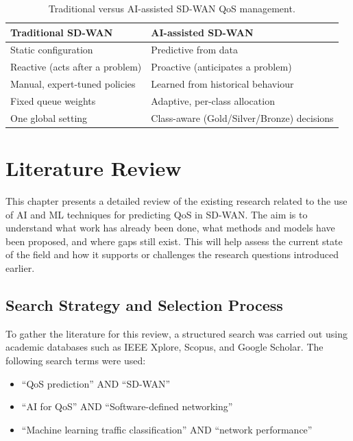 \documentclass[a4paper,12pt]{Classes/RoboticsLaTeX}
\begin{document}
    \begin{table}[H]
    \centering
    \caption{Traditional versus AI-assisted SD-WAN QoS management.}
    \label{tab:trad_vs_ai}
    \begin{tabular}{|p{5.5cm}|p{5.5cm}|}
    \hline
    \textbf{Traditional SD-WAN} & \textbf{AI-assisted SD-WAN} \\
    \hline
    Static configuration & Predictive from data \\
    \hline
    Reactive (acts after a problem) & Proactive (anticipates a problem) \\
    \hline
    Manual, expert-tuned policies & Learned from historical behaviour \\
    \hline
    Fixed queue weights & Adaptive, per-class allocation \\
    \hline
    One global setting & Class-aware (Gold/Silver/Bronze) decisions \\
    \hline
    \end{tabular}
    \end{table}

\chapter{Literature Review}
\label{chap:lit_review}

This chapter presents a detailed review of the existing research related to the use of AI and ML techniques for predicting QoS in SD-WAN. The aim is to understand what work has already been done, what methods and models have been proposed, and where gaps still exist. This will help assess the current state of the field and how it supports or challenges the research questions introduced earlier.

\section{Search Strategy and Selection Process}

To gather the literature for this review, a structured search was carried out using academic databases such as IEEE Xplore, Scopus, and Google Scholar. The following search terms were used:

\begin{itemize}
    \item ``QoS prediction'' AND ``SD-WAN''
    \item ``AI for QoS'' AND ``Software-defined networking''
    \item ``Machine learning traffic classification'' AND ``network performance''
\end{itemize}
\end{document}
